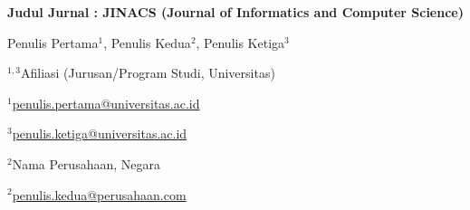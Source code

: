 
\begin{center}
{\twentyp\textbf{Judul Jurnal : JINACS (Journal of Informatics and Computer Science)}}
\vspace{1em}

{\elevenp Penulis Pertama$^1$, Penulis Kedua$^2$, Penulis Ketiga$^3$}
\vspace{0.5em}

{\tenp $^{1,3}$Afiliasi (Jurusan/Program Studi, Universitas)}

{\ninep \href{mailto:penulis.pertama@universitas.ac.id}{$^1$penulis.pertama@universitas.ac.id}}

{\ninep \href{mailto:penulis.ketiga@universitas.ac.id}{$^3$penulis.ketiga@universitas.ac.id}}

{\tenp $^2$Nama Perusahaan, Negara}

{\ninep \href{mailto:penulis.kedua@perusahaan.com}{$^2$penulis.kedua@perusahaan.com}}

\end{center}
